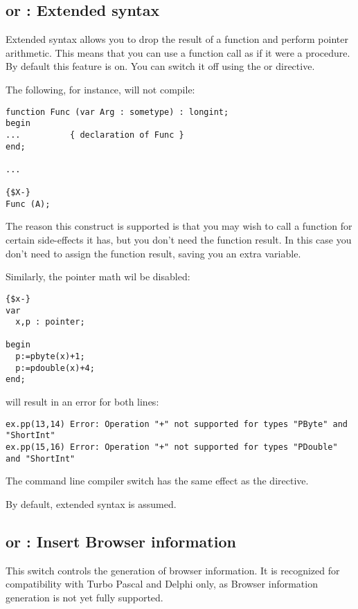 \subsection{ or  : Extended syntax}

Extended syntax allows you to drop the result of a function and perform
pointer arithmetic. This means that
you can use a function call as if it were a procedure. By default this feature
is on. You can switch it off using the  or
directive.

The following, for instance, will not compile:
\begin{verbatim}
function Func (var Arg : sometype) : longint;
begin
...          { declaration of Func }
end;

...

{$X-}
Func (A);
\end{verbatim}
The reason this construct is supported is that you may wish to call a
function for certain side-effects it has, but you don't need the function
result. In this case you don't need to assign the function result, saving
you an extra variable.

Similarly, the pointer math wil be disabled:
\begin{verbatim}
{$x-}
var
  x,p : pointer;

begin
  p:=pbyte(x)+1;
  p:=pdouble(x)+4;
end;
\end{verbatim}
will result in an error for both lines:
\begin{verbatim}
ex.pp(13,14) Error: Operation "+" not supported for types "PByte" and "ShortInt"                                                            
ex.pp(15,16) Error: Operation "+" not supported for types "PDouble" and "ShortInt"
\end{verbatim}

The command line compiler switch  has the same effect as the
 directive.

By default, extended syntax is assumed.

\subsection{ or  : Insert Browser information}

This switch controls the generation of browser information. It is recognized
for compatibility with Turbo Pascal and Delphi only, as Browser information
generation is not yet fully supported.


